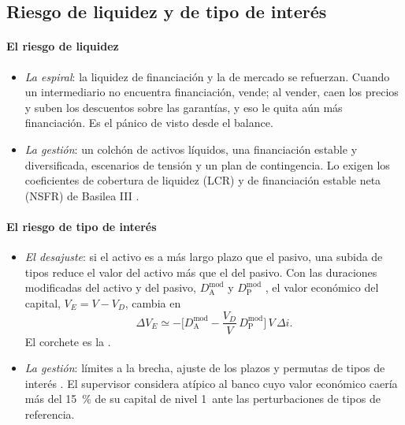 \documentclass[11pt]{article}
\begin{document}
\subsection{Riesgo de liquidez y de tipo de interés}\label{sec:riesgo-liquidez}

\paragraph{El riesgo de liquidez}

\begin{itemize}
\item \emph{La espiral}: la liquidez de financiación y la de mercado se refuerzan. Cuando un intermediario no encuentra financiación, vende; al vender, caen los precios y suben los descuentos sobre las garantías, y eso le quita aún más financiación\nocite{BrunnermeierPedersen2009}. Es el pánico de \textcite{DiamondDybvig1983Bank} visto desde el balance.
\item \emph{La gestión}: un colchón de activos líquidos, una financiación estable y diversificada, escenarios de tensión y un plan de contingencia. Lo exigen los coeficientes de cobertura de liquidez (LCR) y de financiación estable neta (NSFR) de Basilea III .
\end{itemize}

\paragraph{El riesgo de tipo de interés}

\begin{itemize}
\item \emph{El desajuste}: si el activo es a más largo plazo que el pasivo, una subida de tipos reduce el valor del activo más que el del pasivo. Con las duraciones modificadas del activo y del pasivo, $D^{\mathrm{mod}}_{\mathrm A}$ y $D^{\mathrm{mod}}_{\mathrm P}$ , el valor económico del capital, $V_E=V-V_D$, cambia en
  \[
  \Delta V_E\simeq-\Big[D^{\mathrm{mod}}_{\mathrm A}-\frac{V_D}{V}\,D^{\mathrm{mod}}_{\mathrm P}\Big]\,V\,\Delta i .
  \]
  El corchete es la .
\item \emph{La gestión}: límites a la brecha, ajuste de los plazos y permutas de tipos de interés . El supervisor considera atípico al banco cuyo valor económico caería más del 15~\% de su capital de nivel 1~ante las perturbaciones de tipos de referencia\nocite{BCBS2016IRRBB}.
\end{itemize}
\end{document}
